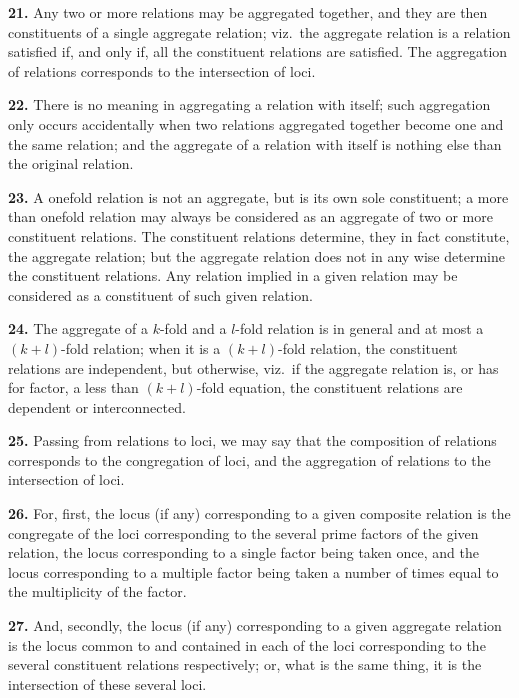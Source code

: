 \documentclass[11pt,a4paper]{article}
\theoremstyle{definition}
\begin{document}
\noindent\textbf{21.} Any two or more relations may be aggregated together, and they are then constituents of a single aggregate relation; viz.\ the aggregate relation is a relation satisfied if, and only if, all the constituent relations are satisfied. The aggregation of relations corresponds to the intersection of loci.

\noindent\textbf{22.} There is no meaning in aggregating a relation with itself; such aggregation only occurs accidentally when two relations aggregated together become one and the same relation; and the aggregate of a relation with itself is nothing else than the original relation.

\noindent\textbf{23.} A onefold relation is not an aggregate, but is its own sole constituent; a more than onefold relation may always be considered as an aggregate of two or more constituent relations. The constituent relations determine, they in fact constitute, the aggregate relation; but the aggregate relation does not in any wise determine the constituent relations. Any relation implied in a given relation may be considered as a constituent of such given relation.

\setcounter{page}{458}

\noindent\textbf{24.} The aggregate of a $k$-fold and a $l$-fold relation is in general and at most a $(k+l)$-fold relation; when it is a $(k+l)$-fold relation, the constituent relations are independent, but otherwise, viz.\ if the aggregate relation is, or has for factor, a less than $(k+l)$-fold equation, the constituent relations are dependent or interconnected.

\noindent\textbf{25.} Passing from relations to loci, we may say that the composition of relations corresponds to the congregation of loci, and the aggregation of relations to the intersection of loci.

\noindent\textbf{26.} For, first, the locus (if any) corresponding to a given composite relation is the congregate of the loci corresponding to the several prime factors of the given relation, the locus corresponding to a single factor being taken once, and the locus corresponding to a multiple factor being taken a number of times equal to the multiplicity of the factor.

\noindent\textbf{27.} And, secondly, the locus (if any) corresponding to a given aggregate relation is the locus common to and contained in each of the loci corresponding to the several constituent relations respectively; or, what is the same thing, it is the intersection of these several loci.
\end{document}
